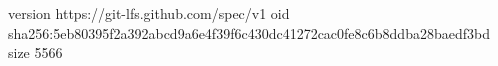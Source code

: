version https://git-lfs.github.com/spec/v1
oid sha256:5eb80395f2a392abcd9a6e4f39f6c430dc41272cac0fe8c6b8ddba28baedf3bd
size 5566
